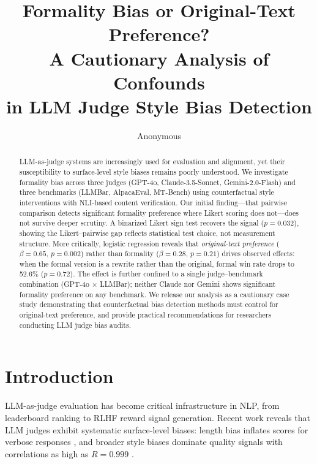\documentclass[11pt,a4paper]{article}
\title{Formality Bias or Original-Text Preference?\\A Cautionary Analysis of Confounds\\in LLM Judge Style Bias Detection}
\author{Anonymous}
\date{}
\begin{document}
\maketitle

\begin{abstract}
LLM-as-judge systems are increasingly used for evaluation and alignment, yet their susceptibility to surface-level style biases remains poorly understood. We investigate formality bias across three judges (GPT-4o, Claude-3.5-Sonnet, Gemini-2.0-Flash) and three benchmarks (LLMBar, AlpacaEval, MT-Bench) using counterfactual style interventions with NLI-based content verification. Our initial finding---that pairwise comparison detects significant formality preference where Likert scoring does not---does not survive deeper scrutiny. A binarized Likert sign test recovers the signal ($p=0.032$), showing the Likert--pairwise gap reflects statistical test choice, not measurement structure. More critically, logistic regression reveals that \emph{original-text preference} ($\beta=0.65$, $p=0.002$) rather than formality ($\beta=0.28$, $p=0.21$) drives observed effects: when the formal version is a rewrite rather than the original, formal win rate drops to 52.6\% ($p=0.72$). The effect is further confined to a single judge--benchmark combination (GPT-4o $\times$ LLMBar); neither Claude nor Gemini shows significant formality preference on any benchmark. We release our analysis as a cautionary case study demonstrating that counterfactual bias detection methods must control for original-text preference, and provide practical recommendations for researchers conducting LLM judge bias audits.
\end{abstract}

\section{Introduction}

LLM-as-judge evaluation has become critical infrastructure in NLP, from leaderboard ranking \citep{zheng2024chatbot,li2024alpacaeval} to RLHF reward signal generation. Recent work reveals that LLM judges exhibit systematic surface-level biases: length bias inflates scores for verbose responses \citep{dubois2024alpacaeval}, and broader style biases dominate quality signals with correlations as high as $R=0.999$ \citep{sosbench2025}.
\end{document}
